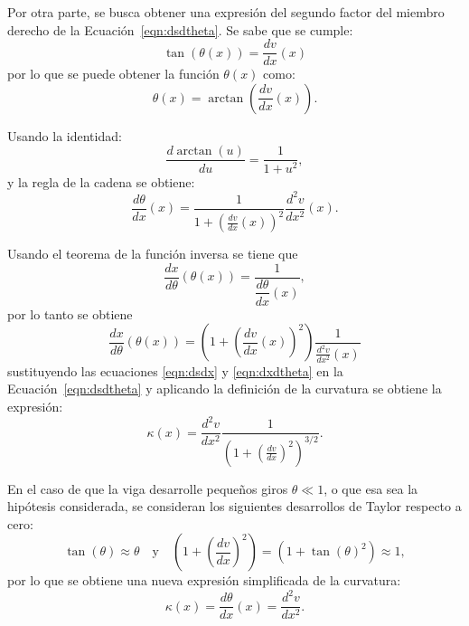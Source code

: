 Por otra parte, se busca obtener una expresión del segundo factor del miembro derecho de la Ecuación~\eqref{eqn:dsdtheta}. Se sabe que se cumple:
%
\begin{equation}
\tan(\theta(x) ) = \frac{d v}{d x} (x)
\end{equation}
%
por lo que se puede obtener la función $\theta(x)$ como:
%
\begin{equation}
\theta(x) = \arctan \left( \frac{d v}{d x} (x) \right).
\end{equation}

Usando la identidad:
%
\begin{equation}
\frac{d \arctan (u)}{d u} = \frac{1}{1+ u^2},
\end{equation}
%
y la regla de la cadena se obtiene:
\begin{equation}
\frac{d \theta }{d x} (x) = \frac{1}{ 1 + \left( \frac{dv}{dx} (x)\right)^2} \frac{d^2 v}{d x^2}(x) .
\end{equation}

Usando el teorema de la función inversa se tiene que 
$$
\frac{d x}{d\theta}\left( \theta(x) \right) = \frac{1}{\dfrac{d \theta}{dx}(x)},
$$
por lo tanto se obtiene
%
\begin{equation}\label{eqn:dxdtheta}
\frac{d x}{d\theta}(\theta(x)) =  \left( 1 + \left( \frac{dv}{dx} (x)\right)^2 \right)  \frac{1}{  \frac{d^2 v}{d x^2}(x)}
\end{equation}
%
sustituyendo las ecuaciones \eqref{eqn:dsdx} y \eqref{eqn:dxdtheta} en la Ecuación~\eqref{eqn:dsdtheta} y aplicando la definición de la curvatura se obtiene la expresión:
%
\begin{equation}
\kappa(x) = \frac{d^2 v}{d x^2} \frac{1}{\left( 1+ \left( \frac{dv}{d x}\right)^2 \right)^{3/2}}.
\end{equation}
%

En el caso de que la viga desarrolle pequeños giros $\theta \ll 1 $, o que esa sea la hipótesis considerada, se consideran los siguientes desarrollos de Taylor respecto a cero:
%
\begin{equation}
\tan(\theta) \approx \theta  \quad \text{y}\quad \left( 1+ \left( \frac{dv}{d x}\right)^2 \right) = (1 + \tan(\theta)^2 ) \approx 1,
\end{equation}
%
por lo que se obtiene una nueva expresión simplificada de la curvatura:
%
\begin{equation}\label{eqn:defcurv}
\kappa (x) =  \frac{d\theta}{d x}(x) = \frac{d^2 v}{d x^2}.
\end{equation}

